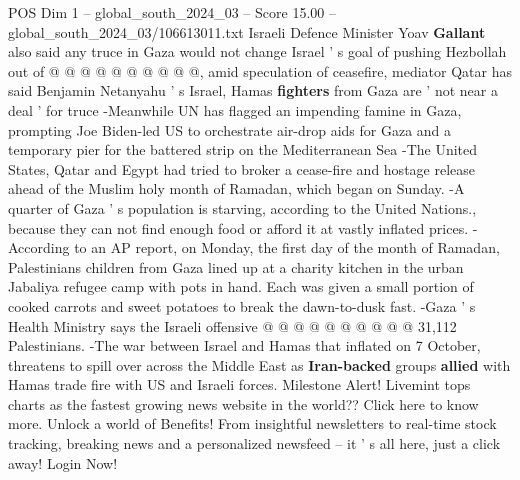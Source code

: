 \begin{textsample}{POS Dim 1 – global\_south\_2024\_03 – Score 15.00 – global\_south\_2024\_03/106613011.txt}
Israeli Defence Minister Yoav \textbf{Gallant} also said any truce in Gaza would not change Israel ' s goal of pushing Hezbollah out of @ @ @ @ @ @ @ @ @ @, amid speculation of ceasefire, mediator Qatar has said Benjamin Netanyahu ' s Israel, Hamas \textbf{fighters} from Gaza are ' not near a deal ' for truce -Meanwhile UN has flagged an impending famine in Gaza, prompting Joe Biden-led US to orchestrate air-drop aids for Gaza and a temporary pier for the battered strip on the Mediterranean Sea -The United States, Qatar and Egypt had tried to broker a cease-fire and hostage release ahead of the Muslim holy month of Ramadan, which began on Sunday. -A quarter of Gaza ' s population is starving, according to the United Nations., because they can not find enough food or afford it at vastly inflated prices. -According to an AP report, on Monday, the first day of the month of Ramadan, Palestinians children from Gaza lined up at a charity kitchen in the urban Jabaliya refugee camp with pots in hand.
Each was given a small portion of cooked carrots and sweet potatoes to break the dawn-to-dusk fast. -Gaza ' s Health Ministry says the Israeli offensive @ @ @ @ @ @ @ @ @ @ 31,112 Palestinians. -The war between Israel and Hamas that inflated on 7 October, threatens to spill over across the Middle East as \textbf{Iran-backed} groups \textbf{allied} with Hamas trade fire with US and Israeli forces.
Milestone Alert!
Livemint tops charts as the fastest growing news website in the world??
Click here to know more.
Unlock a world of Benefits!
From insightful newsletters to real-time stock tracking, breaking news and a personalized newsfeed -- it ' s all here, just a click away!
Login Now!

\end{textsample}

